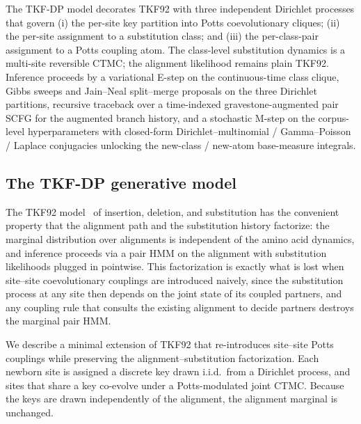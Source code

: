 
The TKF-DP model decorates TKF92 with three independent Dirichlet
processes that govern (i) the per-site key partition into Potts
coevolutionary cliques; (ii) the per-site assignment to a
substitution class; and (iii) the per-class-pair assignment to a
Potts coupling atom. The class-level substitution dynamics is a
multi-site reversible CTMC; the alignment likelihood remains plain
TKF92. Inference proceeds by a variational E-step on the
continuous-time class clique, Gibbs sweeps and Jain--Neal
split--merge proposals on the three Dirichlet partitions, recursive
traceback over a time-indexed gravestone-augmented pair SCFG for
the augmented branch history, and a stochastic M-step on the
corpus-level hyperparameters with closed-form
Dirichlet--multinomial / Gamma--Poisson / Laplace conjugacies
unlocking the new-class / new-atom base-measure integrals.

\subsection{The TKF-DP generative model}
\label{sec:tkfdp-model}

The TKF92 model~\citep{ThorneEtAl92} of insertion, deletion, and
substitution has the convenient property that the alignment path
and the substitution history factorize: the marginal distribution
over alignments is independent of the amino acid dynamics, and
inference proceeds via a pair HMM on the alignment with substitution
likelihoods plugged in pointwise. This factorization is exactly
what is lost when site--site coevolutionary couplings are introduced
naively, since the substitution process at any site then depends on
the joint state of its coupled partners, and any coupling rule that
consults the existing alignment to decide partners destroys the
marginal pair HMM.

We describe a minimal extension of TKF92 that re-introduces
site--site Potts couplings while preserving the
alignment--substitution factorization. Each newborn site is assigned
a discrete key drawn i.i.d.\ from a Dirichlet process, and sites
that share a key co-evolve under a Potts-modulated joint CTMC.
Because the keys are drawn independently of the alignment, the
alignment marginal is unchanged.

